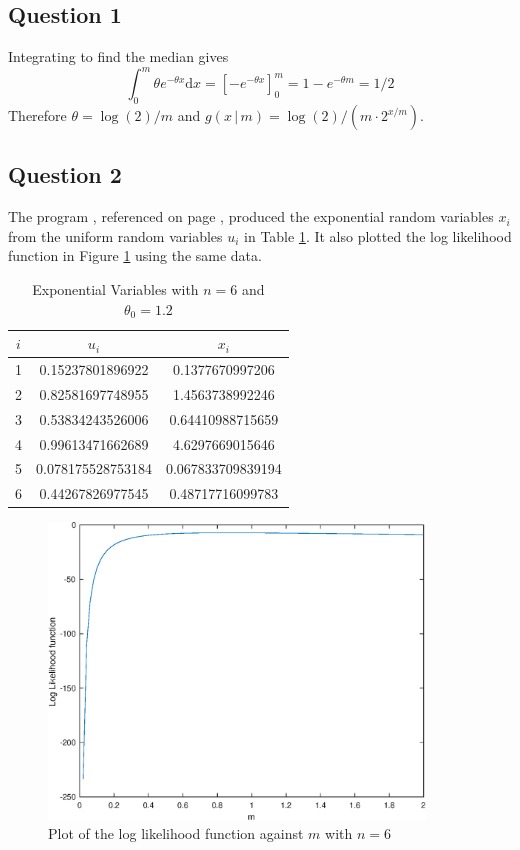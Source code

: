\documentclass[10pt,a4paper,notitlepage]{article}
\author{Jonah Gibbon}
\begin{document}
\subsection*{\centering Question 1}\label{sec:Q1}
Integrating to find the median gives
\begin{equation}
\int_{0}^{m}\theta e^{-\theta x}\mathrm{d}x=\left[-e^{-\theta x}\right]^{m}_{0}=1-e^{-\theta m}=1/2
\end{equation}
Therefore $\theta= \log(2)/m$ and $g(x\, |\, m)= \log(2)/(m\cdot 2^{x/m})$.
\subsection*{\centering Question 2}\label{sec:Q2}
The program , referenced on page \pageref{cd:2.1}, produced the exponential random variables $x_{i}$ from the uniform random variables $u_{i}$ in Table \ref{tb:Q2}. It also plotted the log likelihood function in Figure \ref{fig:Q2} using the same data. 
\begin{table}[H]
\centering
\begin{tabular}{|c|c|c|}\hline $i$ & $u_{i}$ & $x_{i}$\\ \hline 1 & 0.15237801896922 & 0.1377670997206\\ 2 & 0.82581697748955 & 1.4563738992246\\ 3 & 0.53834243526006 & 0.64410988715659\\ 4 & 0.99613471662689 & 4.6297669015646\\ 5 & 0.078175528753184 & 0.067833709839194\\ 6 & 0.44267826977545 & 0.48717716099783 \\ \hline \end{tabular}
\caption{Exponential Variables with $n=6$ and $\theta_{0}=1.2$}
\label{tb:Q2}
\end{table}
\begin{figure}[H]
\begin{center}
\includegraphics[width=10cm]{Image_3_1}
\caption{Plot of the log likelihood function against $m$ with $n=6$}
\label{fig:Q2}
\end{center}
\end{figure}
\end{document}
